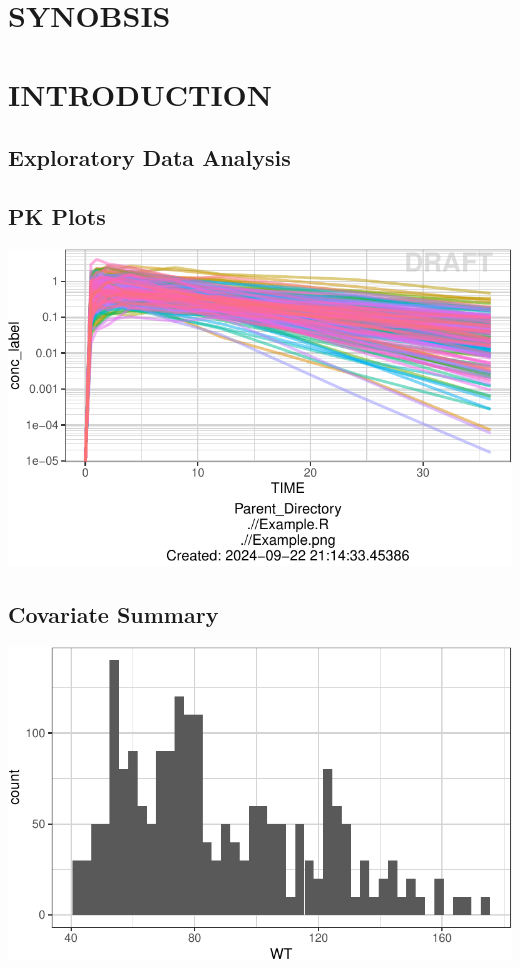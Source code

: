 \documentclass[
  letterpaper,
  toc=chapterentrywithdots,
  11pt,
  headings=small]{scrreprt}
\begin{document}

\chapter*{SYNOBSIS}\label{sec-synobsis}



\chapter{INTRODUCTION}\label{sec-introduction}

\section{Exploratory Data Analysis}\label{exploratory-data-analysis}

\section{PK Plots}\label{pk-plots}

\includegraphics{sec/introduction_files/figure-pdf/unnamed-chunk-2-1.pdf}

\section{Covariate Summary}\label{covariate-summary}

\includegraphics{sec/introduction_files/figure-pdf/unnamed-chunk-3-1.pdf}
\end{document}
